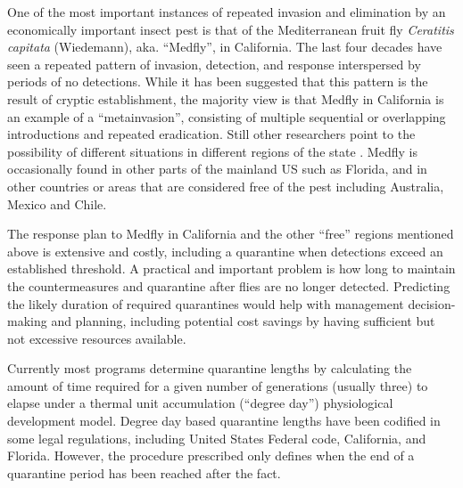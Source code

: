 \documentclass[10pt,a4paper,twocolumn]{article}
\begin{document}
One of the most important instances of repeated invasion 
and elimination by an economically important insect pest is that of 
the Mediterranean fruit fly \textit{Ceratitis capitata} (Wiedemann), aka. ``Medfly'', 
in California.  
The last four decades have seen a repeated pattern of
invasion, detection, and response 
interspersed by periods of no detections\cite{carey_establishment_1991, papadopoulos_trickle_2013}.
While it has been suggested that this pattern is the result of
cryptic establishment\cite{carey201730}, 
the majority view is
that Medfly in California is an example of 
a ``metainvasion'', consisting of multiple sequential or
overlapping introductions\cite{davies_bioinvasions_1999}
and repeated eradication\cite{haymer_genetic_1997}.
Still other researchers point to the possibility of different situations
in different regions of the state
\cite{bonizzoni_microsatellite_2001,gasperi_genetic_2002}.
Medfly is occasionally found in 
other parts of the mainland US such as Florida\cite{szyniszewska2016analysis},
and in other countries or areas that are considered 
free of the pest including Australia, Mexico and Chile\cite{mcinnis2017can}.

The response plan to Medfly in California and the other ``free'' 
regions mentioned above is extensive and costly, 
including a quarantine when detections exceed an established threshold\cite{gilbert_insect_2013}.
A practical and important problem is how long to maintain 
the countermeasures and quarantine after flies are no longer detected.
Predicting the likely duration of required quarantines would help with
management decision-making and planning,
including potential cost savings by having sufficient but not excessive
resources available.

Currently most programs determine quarantine lengths 
by calculating the amount of time required for a given number 
of generations (usually three) to elapse under a thermal unit accumulation (``degree day'')
physiological development model.
Degree day based quarantine lengths have been codified in some legal
regulations, including 
United States Federal code\cite{US-301.32-10},
California\cite{3-CA-ADC-3406}, and Florida.
However, the procedure prescribed only defines when the end of a
quarantine period has been reached after the fact.
\end{document}
